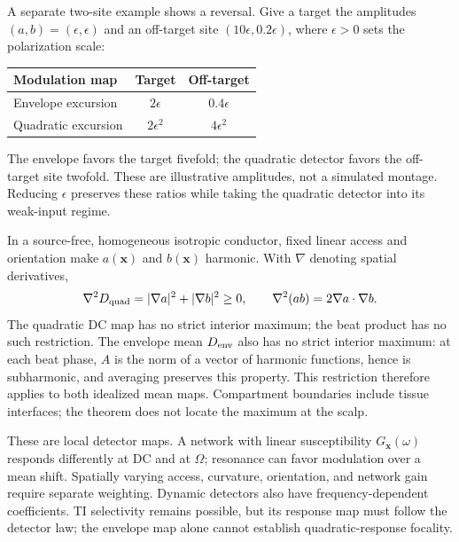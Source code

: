 \documentclass[11pt,a4paper]{article}
\newcommand{\xx}{\mathbf{x}}
\newcommand{\head}[1]{\par\vspace{4pt}{\large\bfseries #1}\par\vspace{2pt}}
\begin{document}
A separate two-site example shows a reversal. Give a target the amplitudes
$(a,b)=(\epsilon,\epsilon)$ and an off-target site $(10\epsilon,0.2\epsilon)$,
where $\epsilon>0$ sets the polarization scale:
\begin{center}
\renewcommand{\arraystretch}{1.15}
\begin{tabular}{@{}lcc@{}}
\toprule
Modulation map & Target & Off-target\\
\midrule
Envelope excursion & $2\epsilon$ & $0.4\epsilon$\\
Quadratic excursion & $2\epsilon^2$ & $4\epsilon^2$\\
\bottomrule
\end{tabular}
\end{center}
The envelope favors the target fivefold; the quadratic detector favors the off-target
site twofold. These are illustrative amplitudes, not a simulated montage. Reducing
$\epsilon$ preserves these ratios while taking the quadratic detector into its weak-input regime.

\head{A DC restriction does not prohibit a beat focus}
In a source-free, homogeneous isotropic conductor, fixed linear access and orientation
make $a(\xx)$ and $b(\xx)$ harmonic. With $\nabla$ denoting spatial derivatives,
\begin{equation}
\nabla^2D_{\rm quad}=|\nabla a|^2+|\nabla b|^2\ge0,
\qquad
\nabla^2(ab)=2\nabla a\cdot\nabla b .
\end{equation}
The quadratic DC map has no strict interior maximum; the beat product has no such
restriction. The envelope mean $D_{\rm env}$ also has no strict interior maximum:
at each beat phase, $A$ is the norm of a vector of harmonic functions, hence is
subharmonic, and averaging preserves this property. This restriction therefore
applies to both idealized mean maps. Compartment boundaries include tissue interfaces;
the theorem does not locate the maximum at the scalp.

These are local detector maps. A network with linear susceptibility $G_{\xx}(\omega)$
responds differently at DC and at $\Omega$; resonance can favor modulation over a
mean shift. Spatially varying access, curvature, orientation, and network gain require
separate weighting. Dynamic detectors also have frequency-dependent coefficients.
TI selectivity remains possible, but its response map must follow the detector law;
the envelope map alone cannot establish quadratic-response focality.
\end{document}
